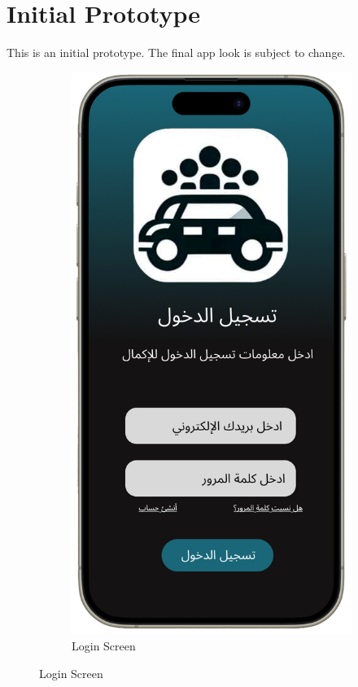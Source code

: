 \documentclass[a4paper, 12pt]{article} %
\begin{document}
    \section{Initial Prototype}
        This is an initial prototype. The final app look is subject to change.
        \begin{figure}[h]
            \centering
                \begin{subfigure}{0.3\textwidth}
                    \includegraphics[width=0.8\linewidth, height=0.9\textheight, keepaspectratio]{Images/App_Desgin_Login.png}
                    \caption{Login Screen}
                    \label{fig:our_login}
                \end{subfigure}

\end{figure}
\end{document}
